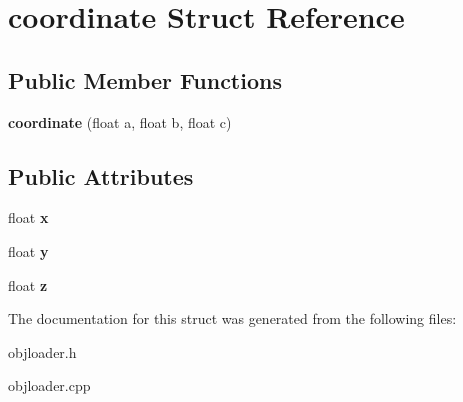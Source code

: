 \hypertarget{structcoordinate}{\section{coordinate Struct Reference}
\label{structcoordinate}
}
\subsection*{Public Member Functions}
\begin{DoxyCompactItemize}
\item 
\hypertarget{structcoordinate_abaa1dc09348970ea176de10ca90d742b}{{\bfseries coordinate} (float a, float b, float c)}\label{structcoordinate_abaa1dc09348970ea176de10ca90d742b}

\end{DoxyCompactItemize}
\subsection*{Public Attributes}
\begin{DoxyCompactItemize}
\item 
\hypertarget{structcoordinate_acde0819ef9d30b7ce25b7d833d3df327}{float {\bfseries x}}\label{structcoordinate_acde0819ef9d30b7ce25b7d833d3df327}

\item 
\hypertarget{structcoordinate_ad48911206c84b1a8306a7023900ff622}{float {\bfseries y}}\label{structcoordinate_ad48911206c84b1a8306a7023900ff622}

\item 
\hypertarget{structcoordinate_adc6bd1c982cdec4d5e7d55b1f7e62374}{float {\bfseries z}}\label{structcoordinate_adc6bd1c982cdec4d5e7d55b1f7e62374}

\end{DoxyCompactItemize}


The documentation for this struct was generated from the following files\-:\begin{DoxyCompactItemize}
\item 
objloader.\-h\item 
objloader.\-cpp\end{DoxyCompactItemize}
